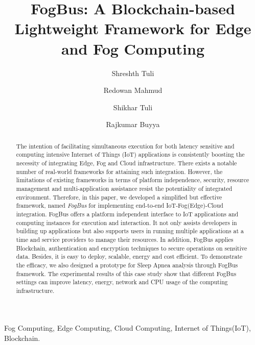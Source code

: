 \documentclass[final,5p,times,twocolumn]{elsarticle}
\begin{document}
\begin{frontmatter}

\title{FogBus: A Blockchain-based Lightweight Framework for Edge and Fog Computing}

\author{Shreshth Tuli}
\author{Redowan Mahmud }
\author{Shikhar Tuli}
\author{Rajkumar Buyya}

\begin{abstract}
The intention of facilitating simultaneous execution for both latency sensitive and computing intensive Internet of Things (IoT) applications is consistently boosting the necessity of integrating Edge, Fog and Cloud infrastructure. There exists a notable number of real-world frameworks for attaining such integration. However, the limitations of existing frameworks in terms of platform independence, security, resource management and multi-application assistance resist the potentiality of integrated environment. Therefore, in this paper, we developed a simplified but effective framework, named \textit{FogBus} for implementing end-to-end IoT-Fog(Edge)-Cloud integration. FogBus offers a platform independent interface to IoT applications and computing instances for execution and interaction. It not only assists developers in building up applications but also supports users in running multiple applications at a time and service providers to manage their resources. In addition, FogBus applies Blockchain, authentication and encryption techniques to secure operations on sensitive data. Besides, it is easy to deploy, scalable, energy and cost efficient. To demonstrate the efficacy, we also designed a prototype for Sleep Apnea analysis through FogBus framework. The experimental results of this case study show that different FogBus settings can improve latency, energy, network and CPU usage of the computing infrastructure.  
\end{abstract}

\begin{keyword}
Fog Computing, Edge Computing, Cloud Computing, Internet of Things(IoT), Blockchain.
\end{keyword}

\end{frontmatter}
\end{document}
